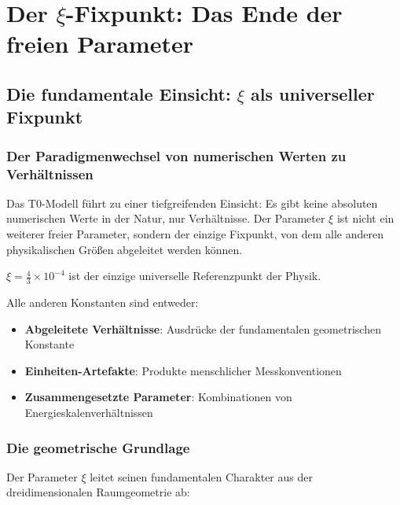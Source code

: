 \documentclass[12pt,a4paper]{report}
\begin{document}
	\chapter{Der $\xi$-Fixpunkt: Das Ende der freien Parameter}
	\label{chap:xi_fixed_point}
	
	\section{Die fundamentale Einsicht: $\xi$ als universeller Fixpunkt}
	\label{sec:xi_universal_fixed_point}
	
	\subsection{Der Paradigmenwechsel von numerischen Werten zu Verhältnissen}
	\label{subsec:paradigm_shift_ratios}
	
	Das T0-Modell führt zu einer tiefgreifenden Einsicht: Es gibt keine absoluten numerischen Werte in der Natur, nur Verhältnisse. Der Parameter $\xi$ ist nicht ein weiterer freier Parameter, sondern der einzige Fixpunkt, von dem alle anderen physikalischen Größen abgeleitet werden können.
	
	\begin{tcolorbox}[colback=red!5!white,colframe=red!75!black,title=Fundamentale Einsicht]
		$\xi = \frac{4}{3} \times 10^{-4}$ ist der einzige universelle Referenzpunkt der Physik.
		
		Alle anderen Konstanten sind entweder:
		\begin{itemize}
			\item \textbf{Abgeleitete Verhältnisse}: Ausdrücke der fundamentalen geometrischen Konstante
			\item \textbf{Einheiten-Artefakte}: Produkte menschlicher Messkonventionen
			\item \textbf{Zusammengesetzte Parameter}: Kombinationen von Energieskalenverhältnissen
		\end{itemize}
	\end{tcolorbox}
	
	\subsection{Die geometrische Grundlage}
	\label{subsec:geometric_foundation}
	
	Der Parameter $\xi$ leitet seinen fundamentalen Charakter aus der dreidimensionalen Raumgeometrie ab:
	
\end{document}
